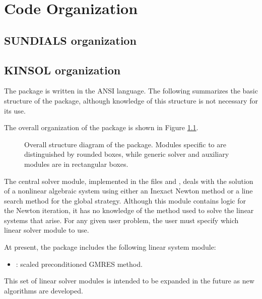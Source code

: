 \chapter{Code Organization}\label{s:organization}

\section{SUNDIALS organization}\label{ss:sun_org}


\section{KINSOL organization}\label{ss:kinsol_org}

The {\kinsol} package is written in the ANSI {\C} language. The following
summarizes the basic structure of the package, although knowledge
of this structure is not necessary for its use.

The overall organization of the {\kinsol} package is shown in Figure
\ref{f:kinorg}.
\begin{figure}
{\centerline{}}
\caption [Overall structure diagram of the {\kinsol} package]
{Overall structure diagram of the {\kinsol} package.
  Modules specific to {\kinsol} are distinguished by rounded boxes, while
  generic solver and auxiliary modules are in rectangular boxes.}
\label{f:kinorg}
\end{figure}

The central solver module, implemented in the files
 and , deals with the solution of a nonlinear
algebraic system using either an Inexact Newton method or a line search method
for the global strategy. Although this module contains logic for the Newton
iteration, it has no knowledge of the method used to solve the linear
systems that arise. For any given user problem, the user must specify
which linear solver module to use.

At present, the package includes the following {\kinsol} linear system
module:
\begin{itemize}
\item {\kinspgmr}: scaled preconditioned GMRES method.
\end{itemize}
This set of linear solver modules is intended to be expanded in the
future as new algorithms are developed.

